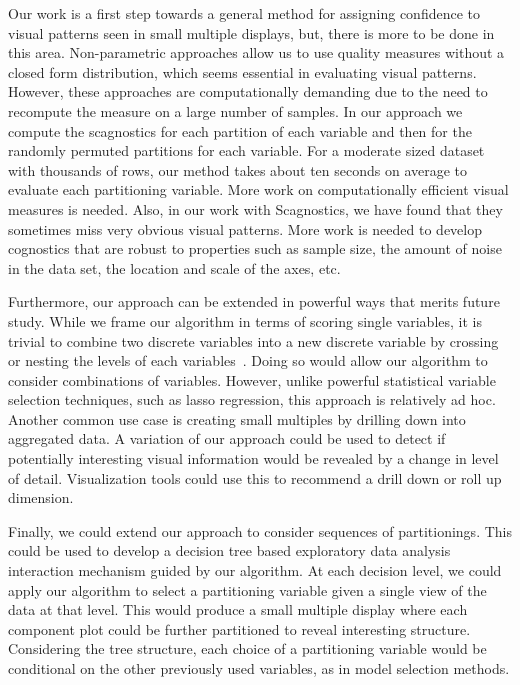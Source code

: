 Our work is a first step towards a general method for assigning confidence to visual patterns seen in small multiple displays, but, there is more to be done in this area. Non-parametric approaches allow us to use quality measures without a closed form distribution, which seems essential in evaluating visual patterns. However, these approaches are computationally demanding due to the need to recompute the measure on a large number of samples. In our approach we compute the scagnostics for each partition of each variable and then for the randomly permuted partitions for each variable. For a moderate sized dataset with thousands of rows, our method takes about ten seconds on average to evaluate each partitioning variable. More work on computationally efficient visual measures is needed. Also, in our work with Scagnostics, we have found that they sometimes miss very obvious visual patterns. More work is needed to develop cognostics that are robust to properties such as sample size, the amount of noise in the data set, the location and scale of the axes, etc. 

Furthermore, our approach can be extended in powerful ways that merits future study. While we frame our algorithm in terms of scoring single variables, it is trivial to combine two discrete variables into a new discrete variable by crossing or nesting the levels of each variables~\cite{Wilkinson2005GG,Stolte2002}. Doing so would allow our algorithm to consider combinations of variables. However, unlike powerful statistical variable selection techniques, such as lasso regression, this approach is relatively ad hoc.
Another common use case is creating small multiples by drilling down into aggregated data. A variation of our approach could be used to detect if potentially interesting visual information would be revealed by a change in level of detail. Visualization tools could use this to recommend a drill down or roll up dimension.

Finally, we could extend our approach to consider sequences of partitionings. This could be used to develop a decision tree based exploratory data analysis interaction mechanism guided by our algorithm. At each decision level, we could apply our algorithm to select a partitioning variable given a single view of the data at that level. This would produce a small multiple display where each component plot could be further partitioned to reveal interesting structure. Considering the tree structure, each choice of a partitioning variable would be conditional on the other previously used variables, as in model selection methods. 

